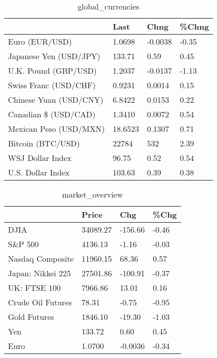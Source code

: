 \documentclass{article}%
\begin{document}
%


\begin{table}[htbp]%
\caption{global\_currencies}%
\centering%
\begin{adjustbox}{width=1\textwidth}%
\begin{tabular}{llll}
\toprule
                       &    Last &    Chng & \%Chng \\
\midrule
        Euro (EUR/USD) &  1.0698 & -0.0038 & -0.35 \\
Japanese Yen (USD/JPY) &  133.71 &    0.59 &  0.45 \\
  U.K. Pound (GBP/USD) &  1.2037 & -0.0137 & -1.13 \\
 Swiss Franc (USD/CHF) &  0.9231 &  0.0014 &  0.15 \\
Chinese Yuan (USD/CNY) &  6.8422 &  0.0153 &  0.22 \\
  Canadian \$ (USD/CAD) &  1.3410 &  0.0072 &  0.54 \\
Mexican Peso (USD/MXN) & 18.6523 &  0.1307 &  0.71 \\
     Bitcoin (BTC/USD) &   22784 &     532 &  2.39 \\
      WSJ Dollar Index &   96.75 &    0.52 &  0.54 \\
     U.S. Dollar Index &  103.63 &    0.39 &  0.38 \\
\bottomrule
\end{tabular}
%
\end{adjustbox}%
\end{table}

%


\begin{table}[htbp]%
\caption{market\_overview}%
\centering%
\begin{adjustbox}{width=1\textwidth}%
\begin{tabular}{llll}
\toprule
                  &    Price &     Chg &  \%Chg \\
\midrule
             DJIA & 34089.27 & -156.66 & -0.46 \\
          S\&P 500 &  4136.13 &   -1.16 & -0.03 \\
 Nasdaq Composite & 11960.15 &   68.36 &  0.57 \\
Japan: Nikkei 225 & 27501.86 & -100.91 & -0.37 \\
     UK: FTSE 100 &  7966.86 &   13.01 &  0.16 \\
Crude Oil Futures &    78.31 &   -0.75 & -0.95 \\
     Gold Futures &  1846.10 &  -19.30 & -1.03 \\
              Yen &   133.72 &    0.60 &  0.45 \\
             Euro &   1.0700 & -0.0036 & -0.34 \\
\bottomrule
\end{tabular}
%
\end{adjustbox}%
\end{table}

%
\end{document}
